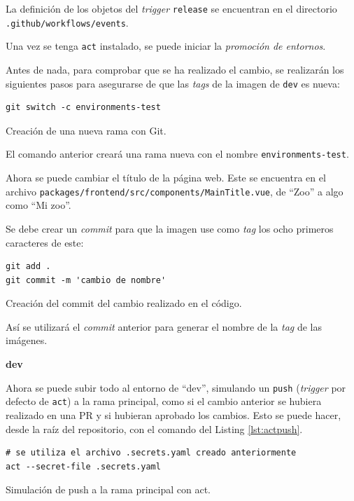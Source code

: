 \begin{enumerate}
    La definición de los objetos del \textit{trigger} \texttt{release} se encuentran en el directorio \texttt{.github/workflows/events}.

    Una vez se tenga \texttt{act} instalado, se puede iniciar la \textit{promoción de entornos}.

    Antes de nada, para comprobar que se ha realizado el cambio, se realizarán los siguientes pasos para asegurarse de que las \textit{tags} de la imagen de \texttt{dev} es nueva:

\begin{listing}[!ht]
  \begin{verbatim}
git switch -c environments-test
  \end{verbatim}
  \caption{Creación de una nueva rama con Git.}
\end{listing}

    El comando anterior creará una rama nueva con el nombre \texttt{environments-test}.

    Ahora se puede cambiar el título de la página web. Este se encuentra en el archivo \texttt{packages/frontend/src/components/MainTitle.vue}, de ``Zoo'' a algo como ``Mi zoo''.

    Se debe crear un \textit{commit} para que la imagen use como \textit{tag} los ocho primeros caracteres de este:

\begin{listing}[!ht]
  \begin{verbatim}
git add .
git commit -m 'cambio de nombre'
  \end{verbatim}
  \caption{Creación del commit del cambio realizado en el código.}
\end{listing}

    Así se utilizará el \textit{commit} anterior para generar el nombre de la \textit{tag} de las imágenes.

    \textbf{dev}

    Ahora se puede subir todo al entorno de ``dev'', simulando un \texttt{push} (\textit{trigger} por defecto de \texttt{act}) a la rama principal, como si el cambio anterior se hubiera realizado en una PR y si hubieran aprobado los cambios. Esto se puede hacer, desde la raíz del repositorio, con el comando del Listing \ref{lst:actpush}.

\begin{listing}[!ht]
  \begin{verbatim}
# se utiliza el archivo .secrets.yaml creado anteriormente
act --secret-file .secrets.yaml
  \end{verbatim}
  \caption{Simulación de push a la rama principal con act.}
\end{listing}


\end{enumerate}
